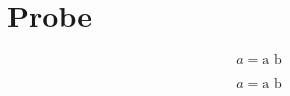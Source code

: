 \chapter{Probe}\label{c99}
\begin{equation}\label{c99.eq.core}a=\text{a b}\end{equation}
\begin{vertiefung}[id=c99.v1,titel={T},wozu={W},voraussetzung={V},zurueck={Z}]
\begin{equation}\label{c99.eq.deep}a=\text{a b}\end{equation}
\end{vertiefung}
